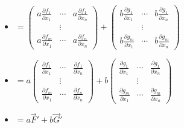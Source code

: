 \documentclass[]{article}
\begin{document}
\begin{itemize}
\item
  \(=\begin{pmatrix} a \frac{\partial f_1}{\partial x_1} & \cdots & a \frac{\partial f_1}{\partial x_n} \\ &\vdots&\\ a \frac{\partial f_m}{\partial x_1} &\cdots& a\frac{\partial f_n}{\partial x_n} \end{pmatrix} + \begin{pmatrix} b\frac{\partial g_1}{\partial x_1} & \cdots & b\frac{\partial g_1}{\partial x_n} \\ &\vdots& \\ b\frac{\partial g_m}{\partial x_1} &\cdots& b\frac{\partial g_m}{\partial x_n} \end{pmatrix}\)
\item
  \(=a \begin{pmatrix} \frac{\partial f_1}{\partial x_1} & \cdots & \frac{\partial f_1}{\partial x_n} \\ &\vdots&\\ \frac{\partial f_m}{\partial x_1} &\cdots& \frac{\partial f_n}{\partial x_n} \end{pmatrix} + b \begin{pmatrix} \frac{\partial g_1}{\partial x_1} & \cdots & \frac{\partial g_1}{\partial x_n} \\ &\vdots& \\ \frac{\partial g_m}{\partial x_1} &\cdots& \frac{\partial g_m}{\partial x_n} \end{pmatrix}\)
\item
  \(=a \vec{F}' +b\vec{G}'\)
\end{itemize}
\end{document}
